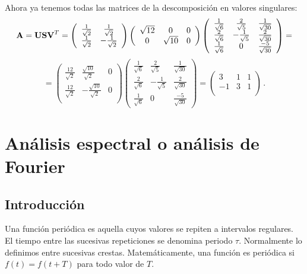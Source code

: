\documentclass[
]{agujournal2019}
\begin{document}
Ahora ya tenemos todas las matrices de la descomposición en valores
singulares:
\[{\textbf A}={\textbf U}{\textbf S}{\textbf V}^T=\left(\begin{array}{cc}
  \frac{1}{\sqrt{2}} & \frac{1}{\sqrt{2}} \\
  \frac{1}{\sqrt{2}} & -\frac{1}{\sqrt{2}} \\
      \end{array}\right)
      \left(\begin{array}{ccc}
  \sqrt{12} & 0 & 0 \\
  0 & \sqrt{10} & 0\\
      \end{array}\right)
      \left(\begin{array}{ccc}
  \frac{1}{\sqrt{6}} & \frac{2}{\sqrt{5}} & \frac{1}{\sqrt{30}}\\
  \frac{2}{\sqrt{6}} & -\frac{1}{\sqrt{5}} & \frac{2}{\sqrt{30}}\\
  \frac{1}{\sqrt{6}} & 0 & \frac{-5}{\sqrt{30}}
      \end{array}\right)=\] \[=\left(\begin{array}{ccc}
  \frac{12}{\sqrt{2}} & \frac{\sqrt{10}}{\sqrt{2}} & 0\\
  \frac{12}{\sqrt{2}} & -\frac{\sqrt{10}}{\sqrt{2}} & 0\\
      \end{array}\right)
      \left(\begin{array}{ccc}
  \frac{1}{\sqrt{6}} & \frac{2}{\sqrt{5}} & \frac{1}{\sqrt{30}}\\
  \frac{2}{\sqrt{6}} & -\frac{1}{\sqrt{5}} & \frac{2}{\sqrt{30}}\\
  \frac{1}{\sqrt{6}} & 0 & \frac{-5}{\sqrt{30}}
      \end{array}\right)=
      \left(\begin{array}{ccc}
  3 & 1 & 1 \\
  -1 & 3 & 1\\
      \end{array}\right)\,.\]

\section{Análisis espectral o análisis de Fourier}

\subsection{Introducción}

Una función periódica es aquella cuyos valores se repiten a intervalos
regulares. El tiempo entre las sucesivas repeticiones se denomina
periodo \(\tau\). Normalmente lo definimos entre sucesivas crestas.
Matemáticamente, una función es periódica si \(f(t)=f(t+T)\) para todo
valor de \(T\).
\end{document}
